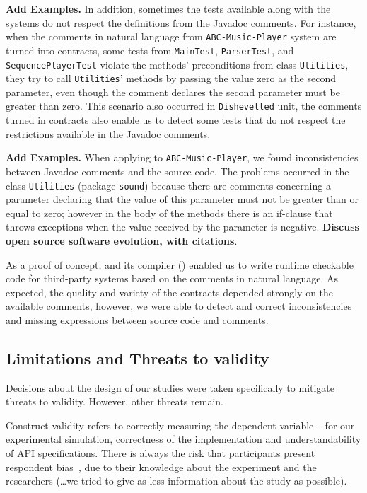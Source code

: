 \textbf{Add Examples. }
In addition, sometimes the tests available along with the systems do
not respect the definitions from the Javadoc comments. For instance, when the
comments in natural language from \texttt{ABC-Music-Player} system are turned into
\contractjdoc{} contracts, some tests from
\texttt{MainTest}, \texttt{ParserTest}, and \texttt{SequencePlayerTest} violate
the methods' preconditions from class \texttt{Utilities}, they try to
call \texttt{Utilities}' methods by passing the value zero as the second
parameter, even though the comment declares the second parameter must be greater than zero.
This scenario also occurred in \texttt{Dishevelled} unit, the comments turned
in \contractjdoc{} contracts also enable us to detect some tests
that do not respect the restrictions available in the Javadoc comments.


\textbf{Add Examples. }
When applying \contractjdoc{} to \texttt{ABC-Music-Player}, we found inconsistencies between Javadoc comments and the source code. The problems occurred in the class \texttt{Utilities} (package
\texttt{sound}) because there are comments concerning a parameter declaring that the value of
this parameter must not be greater than or equal to zero; however in the body of the methods there
is an if-clause that throws exceptions when the value received by the parameter is negative.
\textbf{Discuss open source software evolution, with citations}.

As a proof of concept, \contractjdoc{} and its compiler (\contractjdocCompiler{}) enabled us to write runtime
checkable code for third-party systems based on the comments in natural
language.
As expected, the quality and variety of the contracts depended strongly on the available comments, however, we were able to
detect and correct inconsistencies and missing expressions between source code and comments.




\subsection{Limitations and Threats to validity}
\label{sec:CaseStudyThreats}

Decisions about the design of our studies were taken specifically to mitigate threats to validity. However, other threats remain.

Construct validity refers to correctly measuring the
dependent variable -- for our experimental simulation, correctness of the implementation and understandability of API specifications.
There is always the risk that participants present respondent bias~\cite{},  due to their knowledge about the experiment and the researchers (…we tried to give as less information about the study as possible).

